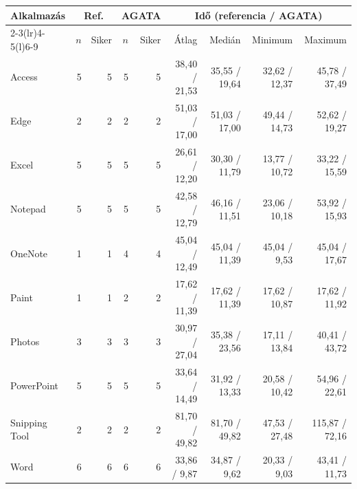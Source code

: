\begin{tabular}{@{}lrrrrrrrr@{}}
\toprule
Alkalmazás & \multicolumn{2}{c}{Ref.} & \multicolumn{2}{c}{AGATA} & \multicolumn{4}{c}{Idő (referencia / AGATA)} \\
\cmidrule(lr){2-3}\cmidrule(lr){4-5}\cmidrule(l){6-9}
 & $n$ & Siker & $n$ & Siker & Átlag & Medián & Minimum & Maximum \\
\midrule
Access & 5 & 5 & 5 & 5 & 38,40 / 21,53 & 35,55 / 19,64 & 32,62 / 12,37 & 45,78 / 37,49 \\
Edge & 2 & 2 & 2 & 2 & 51,03 / 17,00 & 51,03 / 17,00 & 49,44 / 14,73 & 52,62 / 19,27 \\
Excel & 5 & 5 & 5 & 5 & 26,61 / 12,20 & 30,30 / 11,79 & 13,77 / 10,72 & 33,22 / 15,59 \\
Notepad & 5 & 5 & 5 & 5 & 42,58 / 12,79 & 46,16 / 11,51 & 23,06 / 10,18 & 53,92 / 15,93 \\
OneNote & 1 & 1 & 4 & 4 & 45,04 / 12,49 & 45,04 / 11,39 & 45,04 / 9,53 & 45,04 / 17,67 \\
Paint & 1 & 1 & 2 & 2 & 17,62 / 11,39 & 17,62 / 11,39 & 17,62 / 10,87 & 17,62 / 11,92 \\
Photos & 3 & 3 & 3 & 3 & 30,97 / 27,04 & 35,38 / 23,56 & 17,11 / 13,84 & 40,41 / 43,72 \\
PowerPoint & 5 & 5 & 5 & 5 & 33,64 / 14,49 & 31,92 / 13,33 & 20,58 / 10,42 & 54,96 / 22,61 \\
Snipping Tool & 2 & 2 & 2 & 2 & 81,70 / 49,82 & 81,70 / 49,82 & 47,53 / 27,48 & 115,87 / 72,16 \\
Word & 6 & 6 & 6 & 6 & 33,86 / 9,87 & 34,87 / 9,62 & 20,33 / 9,03 & 43,41 / 11,73 \\
\bottomrule
\end{tabular}
